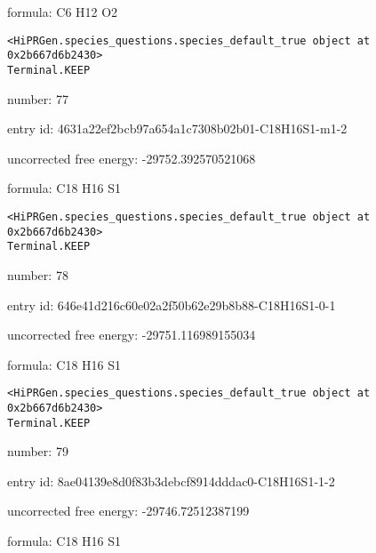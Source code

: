 \documentclass{article}
\begin{document}
formula: C6 H12 O2


\vspace{1cm}
\begin{verbatim}
<HiPRGen.species_questions.species_default_true object at 0x2b667d6b2430>
Terminal.KEEP
\end{verbatim}


number: 77



entry id: 4631a22ef2bcb97a654a1c7308b02b01-C18H16S1-m1-2



uncorrected free energy: -29752.392570521068



formula: C18 H16 S1


\vspace{1cm}
\begin{verbatim}
<HiPRGen.species_questions.species_default_true object at 0x2b667d6b2430>
Terminal.KEEP
\end{verbatim}


number: 78



entry id: 646e41d216c60e02a2f50b62e29b8b88-C18H16S1-0-1



uncorrected free energy: -29751.116989155034



formula: C18 H16 S1


\vspace{1cm}
\begin{verbatim}
<HiPRGen.species_questions.species_default_true object at 0x2b667d6b2430>
Terminal.KEEP
\end{verbatim}


number: 79



entry id: 8ae04139e8d0f83b3debcf8914dddac0-C18H16S1-1-2



uncorrected free energy: -29746.72512387199



formula: C18 H16 S1

\end{document}
